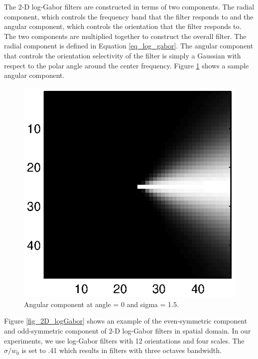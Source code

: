 The 2-D log-Gabor filters are constructed in terms of two
components. The radial component, which controls the frequency band
that the filter responds to and the angular component, which
controls the orientation that the filter responds to. The two
components are multiplied together to construct the overall filter.
The radial component is defined in Equation \ref{eq_log_gabor}.  The
angular component that controls the orientation selectivity of the
filter is simply a Gaussian with respect to the polar angle around
the center frequency. Figure \ref{fig_logGabor_angular} shows a
sample angular component.

\begin{figure}[tbp]
\begin{center}
\includegraphics[scale = .6]{./chapters/figures/logGabor_angular.eps}
\caption{Angular component at angle = 0 and sigma =
1.5.}\label{fig_logGabor_angular}
\end{center}
\end{figure}

Figure \ref{fig_2D_logGabor} shows an example of the even-symmetric
component and odd-symmetric component of 2-D log-Gabor filters in
spatial domain. In our experiments, we use log-Gabor filters with 12
orientations and four scales. The $\sigma/w_0$ is set to .41 which
results in filters with three octaves bandwidth.

